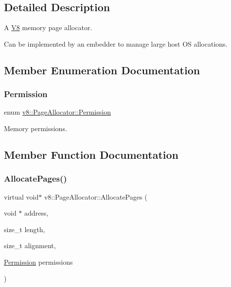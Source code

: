 \subsection{Detailed Description}
A \mbox{\hyperlink{classv8_1_1V8}{V8}} memory page allocator.

Can be implemented by an embedder to manage large host OS allocations. 

\subsection{Member Enumeration Documentation}
\mbox{\label{classv8_1_1PageAllocator_a88f74b164fe97e053259f67a95758415}} 
\subsubsection{\texorpdfstring{Permission}{Permission}}
{\footnotesize\ttfamily enum \mbox{\hyperlink{classv8_1_1PageAllocator_a88f74b164fe97e053259f67a95758415}{v8\+::\+Page\+Allocator\+::\+Permission}}}

Memory permissions. 

\subsection{Member Function Documentation}
\mbox{\label{classv8_1_1PageAllocator_ab3a25ddd2601701f80ee67c4bf017ef7}} 
\subsubsection{\texorpdfstring{Allocate\+Pages()}{AllocatePages()}}
{\footnotesize\ttfamily virtual void$\ast$ v8\+::\+Page\+Allocator\+::\+Allocate\+Pages (\begin{DoxyParamCaption}\item[{void $\ast$}]{address,  }\item[{size\+\_\+t}]{length,  }\item[{size\+\_\+t}]{alignment,  }\item[{\mbox{\hyperlink{classv8_1_1PageAllocator_a88f74b164fe97e053259f67a95758415}{Permission}}}]{permissions }\end{DoxyParamCaption})\hspace{0.3cm}{\ttfamily [pure virtual]}}

